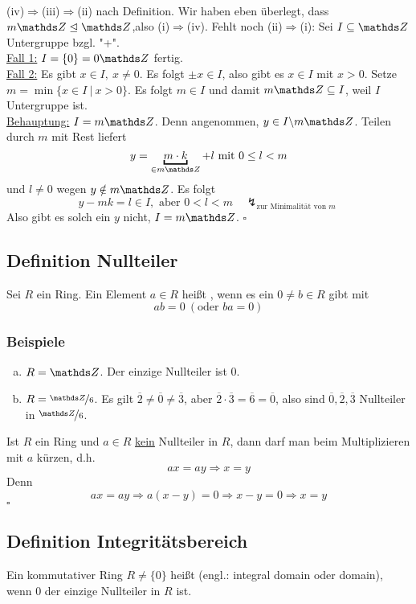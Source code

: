 \\
(iv)$\Rightarrow$(iii)$\Rightarrow$(ii) nach Definition.
Wir haben eben überlegt, dass $m\Z\trianglelefteq \Z$,also (i)$\Rightarrow$(iv).
Fehlt noch (ii)$\Rightarrow$(i): Sei $I\subseteq \Z$ Untergruppe bzgl. "+".\\

\uline{Fall 1:} $I=\{0\}=0\Z$ fertig.\\
\uline{Fall 2:} Es gibt $x\in I,~x\neq 0$. 
Es folgt $\pm x\in I$, also gibt es $x\in I$ mit $x>0$. 
Setze $m=\min\{x\in I~|~x>0\}$.
Es folgt $m\in I$ und damit $m\Z\subseteq I$, weil $I$ Untergruppe ist.\\
\uline{Behauptung:} $I=m\Z$. Denn angenommen, $y\in I\backslash m\Z$. Teilen durch $m$ mit Rest liefert
\[
y=\underbracket{m\cdot k}_{\in m\Z}+l \text{ mit } 0\le l < m
\]
und $l\neq 0$ wegen $y\notin m\Z$.
Es folgt
\[
y-mk=l\in I,\text{ aber } 0<l<m\quad \lightning_{\text{zur Minimalität von }m}
\]
Also gibt es solch ein $y$ nicht, $I=m\Z$.
\hfill $\square$

\subsection{Definition Nullteiler}
\label{sub:def_nullteiler}
Sei $R$ ein Ring. Ein Element $a\in R$ heißt , wenn es ein $0\neq b\in R$ gibt mit 
\[
ab=0 ~(\text{oder }ba=0)
\]
\subsubsection*{Beispiele}
\begin{enumerate}[(a)]
	\item $R=\Z$. 
	Der einzige Nullteiler ist 0.
	\item $R=\nicefrac{\Z}{6}$.
	Es gilt $\overline{2}\neq \overline{0} \neq \overline{3}$, aber $\overline{2}\cdot \overline{3}=\overline{6}=\overline{0}$, also sind $\overline{0},\overline{2},\overline{3}$ Nullteiler in $\nicefrac{\Z}{6}$.
\end{enumerate}
Ist $R$ ein Ring und $a\in R$ \uline{kein} Nullteiler in $R$, dann darf man beim Multiplizieren mit $a$ kürzen, d.h.
\[
ax=ay\Rightarrow x=y
\]
Denn
\[
ax=ay\Rightarrow a(x-y)=0 \Rightarrow x-y=0\Rightarrow x=y
\]
\hfill $\square$


\subsection{Definition Integritätsbereich}
\label{sub:def_integritaetsbereich}
Ein kommutativer Ring $R\neq \{0\}$ heißt  (engl.: integral domain oder domain), wenn 0 der einzige Nullteiler in $R$ ist.

